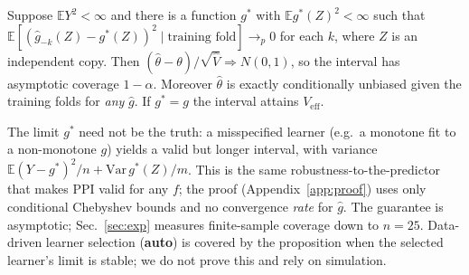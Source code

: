 \begin{proposition}[Validity]\label{prop:valid}
Suppose $\mathbb E Y^2<\infty$ and there is a function $g^*$ with $\mathbb E g^*(Z)^2<\infty$ such that $\mathbb E[(\hat g_{-k}(Z)-g^*(Z))^2\mid\text{training fold}]\to_p0$ for each $k$, where $Z$ is an independent copy. Then $(\hat\theta-\theta)/\sqrt{\hat V}\Rightarrow N(0,1)$, so the interval has asymptotic coverage $1-\alpha$. Moreover $\hat\theta$ is exactly conditionally unbiased given the training folds for \emph{any} $\hat g$. If $g^*=g$ the interval attains $V_{\mathrm{eff}}$.
\end{proposition}
The limit $g^*$ need not be the truth: a misspecified learner (e.g.\ a monotone fit to a non-monotone $g$) yields a valid but longer interval, with variance $\mathbb E(Y-g^*)^2/n+\mathrm{Var}\,g^*(Z)/m$. This is the same robustness-to-the-predictor that makes PPI valid for any $f$; the proof (Appendix~\ref{app:proof}) uses only conditional Chebyshev bounds and no convergence \emph{rate} for $\hat g$. The guarantee is asymptotic; Sec.~\ref{sec:exp} measures finite-sample coverage down to $n=25$. Data-driven learner selection (\textbf{auto}) is covered by the proposition when the selected learner's limit is stable; we do not prove this and rely on simulation.
